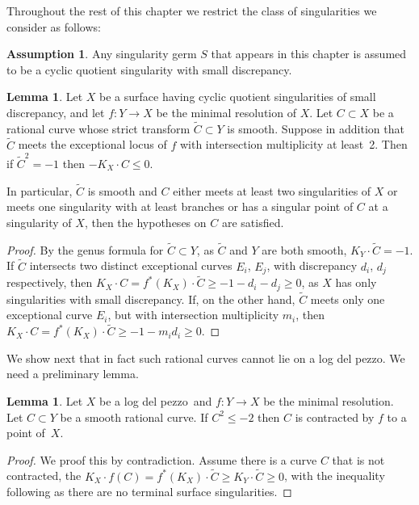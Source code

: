 \documentclass[11pt]{report}
\theoremstyle{definition}
\theoremstyle{definition}
\theoremstyle{definition}
\theoremstyle{definition}
\theoremstyle{definition}
\newtheorem{lem}[thm]{Lemma}
\theoremstyle{definition}
\theoremstyle{definition}
\theoremstyle{definition}
\newtheorem{assumption}[thm]{Assumption}
\newcommand{\ldp}{log del pezzo}
\newcommand{\minres}{minimal resolution}
\newcommand{\wt}[1]{\widetilde #1}
\begin{document}
Throughout the rest of this chapter we restrict the class of singularities we consider as follows:

\begin{assumption}
Any singularity germ $S$ that appears in this chapter is assumed to be a cyclic
quotient singularity with small discrepancy.
\end{assumption}

\begin{lem}\label{lem!badcurve}
Let $X$ be a surface having cyclic quotient singularities of small discrepancy, and let  $f \colon Y \rightarrow X$ be the minimal resolution of $X$. Let $C \subset X$ be a rational curve whose 
strict transform $\widetilde C \subset Y$ is smooth. Suppose in addition that 
$\widetilde C$ meets the exceptional locus of $f$ with intersection multiplicity at least~2.
Then if $\widetilde C^2 = -1$ then $-K_X \cdot C \leq 0$.

In particular, $\widetilde C$ is smooth and
$C$ either meets at least two singularities of $X$ or meets one singularity
with at least branches or has a singular point of $C$ at a singularity of $X$,
then the hypotheses on $C$ are satisfied.
\end{lem}
\begin{proof}
By the genus formula for $\widetilde C\subset Y$, as $\widetilde C$ and $Y$ are both smooth,
$K_Y \cdot \widetilde C = -1$. If $\wt C$ intersects two distinct exceptional curves $E_i$, $E_j$,
with discrepancy $d_i$, $d_j$ respectively, then
 $K_X \cdot C = f^*(K_X) \cdot \widetilde C \geq -1 - d_i - d_j  \geq 0$,
 as $X$ has only singularities with small discrepancy. 
 If, on the other hand, $\wt C$ meets only one exceptional curve $E_i$, but with intersection
multiplicity $m_i$, then $K_X \cdot C = f^*(K_X) \cdot \widetilde C \geq -1 - m_id_i  \geq 0$.
\end{proof}

We show next that in fact such rational curves cannot lie on a \ldp.
We need a preliminary lemma.
\begin{lem}\label{lem!minus2curve}
Let $X$ be a \ldp\ and $f \colon Y \rightarrow X$ be the \minres.
Let $C\subset Y$ be a smooth rational curve. If $C^2\le-2$ then $C$ is contracted by $f$
to a point of~$X$.
\end{lem}

\begin{proof}
We proof this by contradiction. Assume there is a curve $C$ that is not contracted, the $K_X \cdot f(C) = f^*(K_X) \cdot \wt{C} \geq K_Y \cdot \wt{C} \geq 0$, with the inequality following as there are no terminal surface singularities.
\end{proof}
\end{document}
